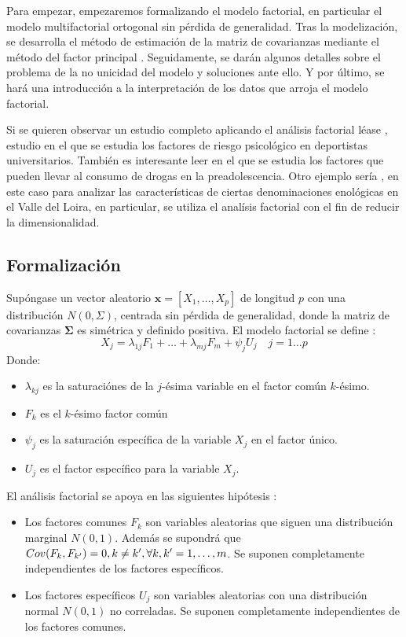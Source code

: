\noindent Para empezar, empezaremos formalizando el modelo factorial, en particular el modelo multifactorial ortogonal \cite{Johnson 2007} sin pérdida de generalidad. Tras la modelización, se desarrolla el método de estimación de la matriz de covarianzas  mediante el método del factor principal \cite{Peña 2002}. Seguidamente, se darán algunos detalles sobre el problema de la no unicidad del modelo y soluciones ante ello. Y por último, se hará una introducción a la interpretación de los datos que arroja el modelo factorial. 


\noindent Si se quieren observar un estudio completo aplicando el análisis factorial léase \cite{Galindo 2015}, estudio en el que se estudia los factores de riesgo psicológico en deportistas universitarios.  También es interesante leer \cite{Diez 2002} en el que se estudia los factores que pueden llevar al consumo de drogas en la preadolescencia. Otro ejemplo sería \cite{Pages 2005}, en este caso para analizar las características de ciertas denominaciones  enológicas en el Valle del Loira, en particular, se utiliza el analísis factorial con el fin de reducir la dimensionalidad. 



\subsection{Formalización}
\noindent Supóngase un vector aleatorio $\mathbf{x}= [X_1, \ldots, X_p]$ de longitud $p$ con una distribución $N(0,\Sigma)$, centrada sin pérdida de generalidad, donde la matriz de covarianzas $\mathbf{\Sigma}$ es simétrica y definido positiva. El modelo factorial se define \cite{Chatfield 1989}:  
\begin{equation}\label{eq Fact}
X_j= \lambda_{1j}F_1+\ldots+\lambda_{mj}F_m+\psi_j U_j\quad j=1\ldots p 
\end{equation}
\noindent Donde:
\begin{itemize}
\item $\lambda_{kj}$ es la saturaciónes   de la $j$-ésima variable en el factor común $k$-ésimo. 
\item $F_k$ es el $k$-ésimo factor común
\item $\psi_j$ es la saturación  específica de la variable $X_j$ en el factor único. 
\item $U_j$ es el factor específico para la variable $X_j$.
\end{itemize}

\noindent El análisis factorial se apoya en las siguientes hipótesis \cite{Cuadras 2014}:
\begin{itemize}
\item Los factores comunes $F_k$ son variables aleatorias que siguen una distribución marginal $N(0,1)$. Además se supondrá que $Cov(F_k,F_{k'})=0, k\neq k',\\ \forall k,k'=1,\ldots, m$. Se suponen completamente independientes de los factores específicos. 

\item Los factores específicos $U_j$ son variables aleatorias con una distribución normal $N(0,1)$ no correladas. Se suponen  completamente independientes de los factores comunes. 
\end{itemize}

